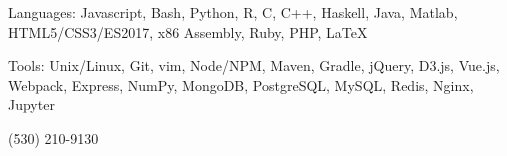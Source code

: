 \documentclass{tccv}
\begin{document}
\begin{eventlist}
\begin{factlist}

\item{Languages: }
     {Javascript, Bash, Python, R, C, C++, Haskell, Java, Matlab, HTML5/CSS3/ES2017, x86 Assembly, Ruby, PHP, \LaTeX}

\item{Tools: }
    {Unix/Linux, Git, vim, Node/NPM, Maven, Gradle, jQuery, D3.js, Vue.js, Webpack, Express, NumPy, MongoDB, PostgreSQL, MySQL, Redis, Nginx, Jupyter}

\end{factlist}

\end{eventlist}

    {(530) 210-9130}
\end{document}
